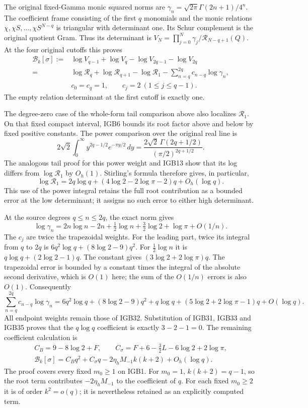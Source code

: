 The original fixed-Gamma monic squared norms are
$\gamma_n=\sqrt{2\pi}\Gamma(2n+1)/4^n$.
The coefficient frame consisting of the first $q$ monomials
and the monic relations $\chi,\chi S,\ldots,\chi S^{N-q}$
is triangular with determinant one. Its Schur complement is
the original quotient Gram. Thus its determinant is
$V_N=\prod_{j=0}^N\gamma_j/\mathcal R_{N-q+1}(Q)$.
At the four original cutoffs this proves
\[
 \begin{aligned}
 \mathcal B_k[\sigma]
 :={}&\log V_{q-1}+\log V_q-\log V_{2q-1}-\log V_{2q}\\
 ={}&\log\mathcal R_q+\log\mathcal R_{q+1}
          -\log\mathcal R_1
       -\sum_{n=q}^{2q}c_{n-q}\log\gamma_n,\\
 &c_0=c_q=1,\qquad c_j=2\ (1\leq j\leq q-1).
 \end{aligned}\tag{IGB32}
\]
The empty relation determinant at the first cutoff is exactly one.

The degree-zero case of the whole-form tail comparison above
also localizes $\mathcal R_1$. On that fixed compact interval,
IGB6 bounds its root factor above and below by fixed positive
constants. The power comparison over the original real line is
\[
 2\sqrt2\int_0^\infty
              y^{2q-1/2}e^{-\pi y/2}\,dy
 =\frac{2\sqrt2\,\Gamma(2q+1/2)}
                       {(\pi/2)^{2q+1/2}}.
\]
The analogous tail proof for this power weight and IGB13 show
that its log differs from $\log\mathcal R_1$ by $O_h(1)$.
Stirling's formula therefore gives, in particular,
\[
 \log\mathcal R_1
 =2q\log q+(4\log2-2\log\pi-2)q+O_h(\log q).
 \tag{IGB33}
\]
This use of the power integral retains the full root contribution
as a bounded error at the low determinant; it assigns no such
error to either high determinant.

At the source degrees $q\leq n\leq2q$, the exact norm gives
\[
 \log\gamma_n
 =2n\log n-2n+\tfrac12\log n+\tfrac32\log2+\log\pi+O(1/n).
 \tag{IGB34}
\]
The $c_j$ are twice the trapezoidal weights.
For the leading part, twice its integral from $q$ to $2q$ is
$6q^2\log q+(8\log2-9)q^2$.
For $\tfrac12\log n$ it is
$q\log q+(2\log2-1)q$.
The constant gives $(3\log2+2\log\pi)q$.
The trapezoidal error is bounded by a constant times the integral
of the absolute second derivative, which is $O(1)$ here;
the sum of the $O(1/n)$ errors is also $O(1)$.
Consequently
\[
 \sum_{n=q}^{2q}c_{n-q}\log\gamma_n
 =6q^2\log q+(8\log2-9)q^2+
   q\log q+(5\log2+2\log\pi-1)q+O(\log q).
 \tag{IGB35}
\]
All endpoint weights remain those of IGB32.
Substitution of IGB31, IGB33 and IGB35 proves that the
$q\log q$ coefficient is exactly $3-2-1=0$.
The remaining coefficient calculation is
\[
 \begin{gathered}
 C_B=9-8\log2+F,\qquad
 C_\sigma=F+6-\tfrac32L-6\log2+2\log\pi,\\
 \boxed{\displaystyle
 \mathcal B_k[\sigma]
 =C_Bq^2+C_\sigma q
        -2\eta_hM_{-1}k(k+2)+O_h(\log q).}
 \end{gathered}\tag{IGB36}
\]
The proof covers every fixed $m_0\geq1$ on IGB1.
For $m_0=1$, $k(k+2)=q-1$, so the root term contributes
$-2\eta_hM_{-1}$ to the coefficient of $q$.
For each fixed $m_0\geq2$ it is of order $k^2=o(q)$;
it is nevertheless retained as an explicitly computed term.

